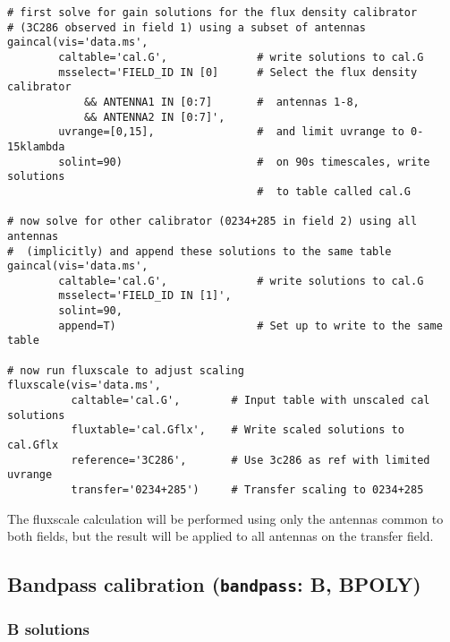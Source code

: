 \small
\begin{verbatim}
# first solve for gain solutions for the flux density calibrator
# (3C286 observed in field 1) using a subset of antennas
gaincal(vis='data.ms',
        caltable='cal.G',              # write solutions to cal.G
        msselect='FIELD_ID IN [0]      # Select the flux density calibrator
            && ANTENNA1 IN [0:7]       #  antennas 1-8,
            && ANTENNA2 IN [0:7]',
        uvrange=[0,15],                #  and limit uvrange to 0-15klambda
        solint=90)                     #  on 90s timescales, write solutions
                                       #  to table called cal.G

# now solve for other calibrator (0234+285 in field 2) using all antennas
#  (implicitly) and append these solutions to the same table
gaincal(vis='data.ms',
        caltable='cal.G',              # write solutions to cal.G
        msselect='FIELD_ID IN [1]',
        solint=90,
        append=T)                      # Set up to write to the same table

# now run fluxscale to adjust scaling
fluxscale(vis='data.ms',
          caltable='cal.G',        # Input table with unscaled cal solutions
          fluxtable='cal.Gflx',    # Write scaled solutions to cal.Gflx
          reference='3C286',       # Use 3c286 as ref with limited uvrange
          transfer='0234+285')     # Transfer scaling to 0234+285
\end{verbatim}
\normalsize

The fluxscale calculation will be performed using only the antennas common
to both fields, but the result will be applied to all antennas on the
transfer field.

\subsection{Bandpass calibration ({\tt bandpass}: B, BPOLY)}
\label{subsection:synth.PB.cal}

\subsubsection{B solutions}
\label{subsubsection:synth.b.solns}


